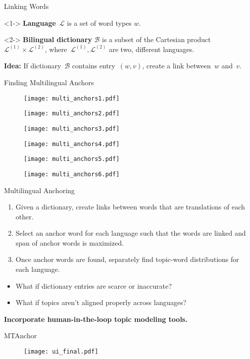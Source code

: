 \begin{frame}{Linking Words}

\begin{definition}<1->
\textbf{Language}~$\mathcal{L}$ is a set of word types $w$.
\end{definition}

\begin{definition}<2->
\textbf{Bilingual dictionary} $\mathcal{B}$ is a subset of the Cartesian product~$\mathcal{L}^{(1)} \times \mathcal{L}^{(2)}$, where~$\mathcal{L}^{(1)}, \mathcal{L}^{(2)}$ are two, different languages.
\end{definition}

\vspace{1cm}
 \textbf{Idea:} If dictionary~$\mathcal{B}$ contains entry~$(w,v)$, create a link between~$w$ and~$v$.
\end{frame}


\begin{frame}{Finding Multilingual Anchors}
\begin{figure}
\begin{overprint}
 \centerline{\texttt{[image: multi\_anchors1.pdf]}}
 \centerline{\texttt{[image: multi\_anchors2.pdf]}}
 \centerline{\texttt{[image: multi\_anchors3.pdf]}}
 \centerline{\texttt{[image: multi\_anchors4.pdf]}}
 \centerline{\texttt{[image: multi\_anchors5.pdf]}}
 \centerline{\texttt{[image: multi\_anchors6.pdf]}}
\end{overprint}
\end{figure}
\end{frame}

\begin{frame}{Multilingual Anchoring}
\begin{enumerate}
\item Given a dictionary, create links between words that are translations of each other.
\item Select an anchor word for each language such that the words are linked and span of anchor words is maximized.
\item Once anchor words are found, separately find topic-word distributions for each language.
\end{enumerate}
\end{frame}

\begin{frame}
\begin{itemize}
\item What if dictionary entries are scarce or inaccurate? 
\item What if topics aren't aligned properly across languages?
\end{itemize}
\pause 
\vspace{1cm}
\textbf{Incorporate human-in-the-loop topic modeling tools.}
\end{frame}

\begin{frame}{MTAnchor}
\begin{figure}
\texttt{[image: ui\_final.pdf]}
\end{figure}
\end{frame}


